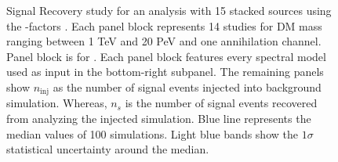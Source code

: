 \begin{figure}[t]
    \caption{Signal Recovery study for an analysis with 15 stacked sources using the \GS \J-factors \cite{Geringer_Sameth_2015}. Each panel block represents 14 studies for DM mass ranging between 1 TeV and 20 PeV and one annihilation channel. Panel block is for \parpar{\nu_\mu}. Each panel block features every spectral model used as input in the bottom-right subpanel. The remaining panels show $n_\mathrm{inj}$ as the number of signal events injected into background simulation. Whereas, $n_s$ is the number of signal events recovered from analyzing the injected simulation. Blue line represents the median values of 100 simulations. Light blue bands show the $1\sigma$ statistical uncertainty around the median.}
    \label{fig:icDM_sigrecovery_1of2}
\end{figure}

\clearpage

